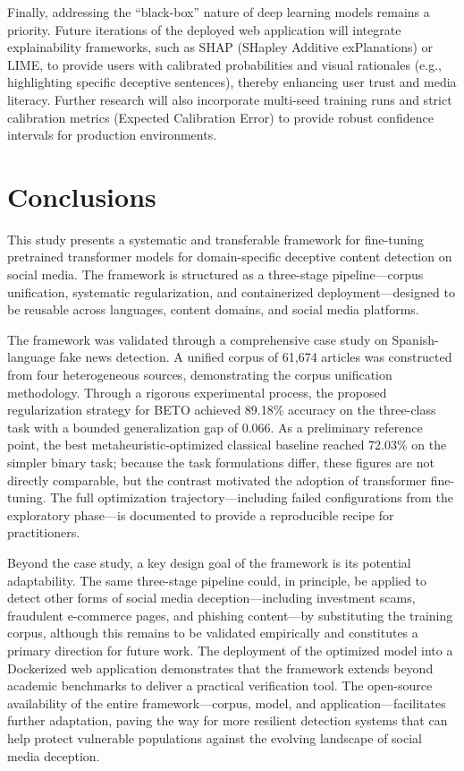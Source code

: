 \documentclass[informatics,article,accept,pdftex,moreauthors]{Definitions/mdpi}
\begin{document}
Finally, addressing the ``black-box'' nature of deep learning models remains a priority. Future iterations of the deployed web application will integrate explainability frameworks, such as SHAP (SHapley Additive exPlanations) or LIME, to provide users with calibrated probabilities and visual rationales (e.g., highlighting specific deceptive sentences), thereby enhancing user trust and media literacy. Further research will also incorporate multi-seed training runs and strict calibration metrics (Expected Calibration Error) to provide robust confidence intervals for production environments.

\section{Conclusions}
This study presents a systematic and transferable framework for fine-tuning pretrained transformer models for domain-specific deceptive content detection on social media. The framework is structured as a three-stage pipeline—corpus unification, systematic regularization, and containerized deployment—designed to be reusable across languages, content domains, and social media platforms.

The framework was validated through a comprehensive case study on Spanish-language fake news detection. A unified corpus of 61,674 articles was constructed from four heterogeneous sources, demonstrating the corpus unification methodology. Through a rigorous experimental process, the proposed regularization strategy for BETO achieved 89.18\% accuracy on the three-class task with a bounded generalization gap of 0.066. As a preliminary reference point, the best metaheuristic-optimized classical baseline reached 72.03\% on the simpler binary task; because the task formulations differ, these figures are not directly comparable, but the contrast motivated the adoption of transformer fine-tuning. The full optimization trajectory—including failed configurations from the exploratory phase—is documented to provide a reproducible recipe for practitioners.

Beyond the case study, a key design goal of the framework is its potential adaptability. The same three-stage pipeline could, in principle, be applied to detect other forms of social media deception—including investment scams, fraudulent e-commerce pages, and phishing content—by substituting the training corpus, although this remains to be validated empirically and constitutes a primary direction for future work. The deployment of the optimized model into a Dockerized web application demonstrates that the framework extends beyond academic benchmarks to deliver a practical verification tool. The open-source availability of the entire framework—corpus, model, and application—facilitates further adaptation, paving the way for more resilient detection systems that can help protect vulnerable populations against the evolving landscape of social media deception.
\end{document}
